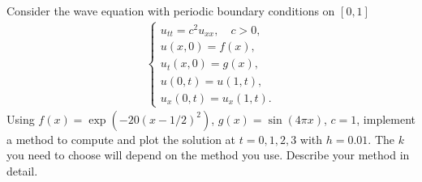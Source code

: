 \documentclass[12pt]{report}
\begin{document}
\newpage



\begin{problem}
    Consider the wave equation with periodic boundary conditions on $[0,1]$
  \begin{align*}
    \begin{cases}
      u_{tt} = c^2 u_{xx}, \quad c > 0,\\
      u(x,0) = f(x),\\
      u_t(x,0) = g(x),\\
      u(0,t) = u(1,t),\\
      u_x(0,t) = u_x(1,t).
    \end{cases}
  \end{align*}
  Using $f(x) = \exp( -20(x-1/2)^2 )$, $g(x) = \sin(4\pi x)$, $c = 1$, implement a method to compute and plot the solution at $t = 0,1,2,3$ with $h = 0.01$.  The $k$ you need to choose will depend on the method you use.  Describe your method in detail. 
\end{problem}
\end{document}
